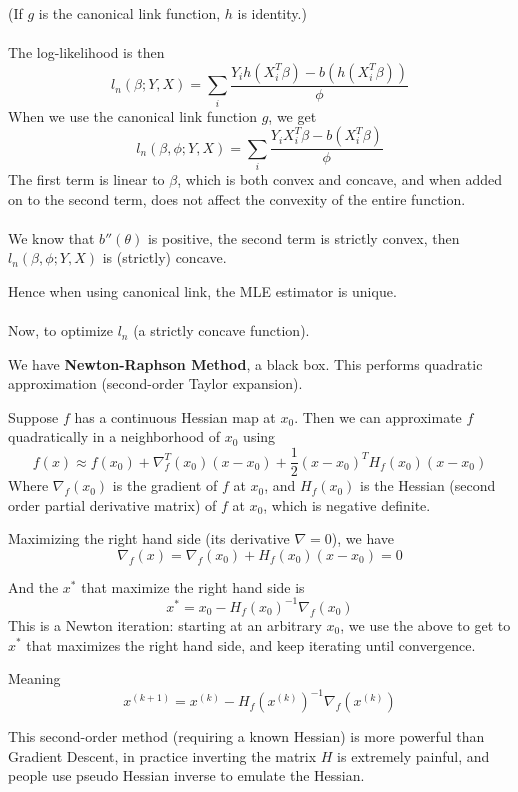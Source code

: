 \documentclass{article}
\begin{document}
(If $g$ is the canonical link function, $h$ is identity.)
\\
\\
The log-likelihood is then
$$
l_n(\beta; Y, X) = \sum_{i} \frac{Y_i h(X^T_i \beta) - b(h(X^T_i \beta))}{\phi}
$$
When we use the canonical link function $g$, we get
$$
l_n(\beta, \phi; Y, X) = \sum_{i} \frac{Y_i X^T_i \beta - b(X^T_i \beta)}{\phi}
$$
The first term is linear to $\beta$, which is both convex and concave,
and when added on to the second term,
does not affect the convexity of the entire function.
\\
\\
We know that $b''(\theta)$ is positive,
the second term is strictly convex,
then $l_n(\beta, \phi; Y, X)$ is (strictly) concave.

Hence when using canonical link, the MLE estimator is unique.
\\
\\

Now, to optimize $l_n$ (a strictly concave function).

We have \textbf{Newton-Raphson Method}, a black box.
This performs quadratic approximation (second-order Taylor expansion).

Suppose $f$ has a continuous Hessian map at $x_0$.
Then we can approximate $f$ quadratically in a neighborhood of $x_0$ using
$$
f(x) \approx f(x_0) + \nabla^T_f (x_0) (x - x_0) + \frac{1}{2} (x - x_0)^T H_f(x_0) (x - x_0)
$$
Where $\nabla_f (x_0)$ is the gradient of $f$ at $x_0$,
and $H_f (x_0)$ is the Hessian (second order partial derivative matrix) of $f$ at $x_0$,
which is negative definite.

Maximizing the right hand side (its derivative $\nabla = 0$), we have
$$
\nabla_f (x) = \nabla_f (x_0) + H_f (x_0) (x - x_0) = 0
$$

And the $x^*$ that maximize the right hand side is
$$
x^* = x_0 - H_f(x_0)^{-1} \nabla_f (x_0)
$$
This is a Newton iteration: starting at an arbitrary $x_0$,
we use the above to get to $x^*$ that maximizes the right hand side,
and keep iterating until convergence.

Meaning
$$
x^{(k + 1)} = x^{(k)} - H_f (x^{(k)})^{-1} \nabla_f(x^{(k)})
$$

This second-order method (requiring a known Hessian) is more powerful than Gradient Descent,
in practice inverting the matrix $H$ is extremely painful,
and people use pseudo Hessian inverse to emulate the Hessian.
\\
\\
\end{document}
